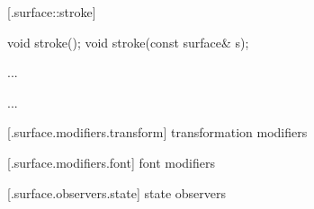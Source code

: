  [\iotwod.surface::stroke] {}

\begin{itemdecl}
void stroke();
void stroke(const surface& s);
\end{itemdecl}
\begin{itemdescr}
	\pnum
	\effects
	...
	
	\pnum
	\postconditions
	...
	
%	
%	

\end{itemdescr}

 [\iotwod.surface.modifiers.transform] { transformation modifiers}

%	
%	

 [\iotwod.surface.modifiers.font] { font modifiers}

%	
%	

 [\iotwod.surface.observers.state] { state observers}

%	

